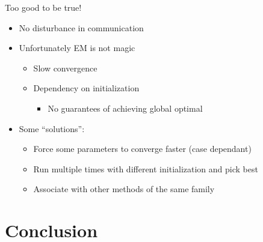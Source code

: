 \documentclass[aspectratio=169]{beamer}
\begin{document}

\begin{frame}{Too good to be true!}{}
  \begin{itemize}[<+(1)->]
    \item No disturbance in communication
    \item Unfortunately EM is not magic
          \begin{itemize}
            \item Slow convergence
            \item Dependency on initialization
                  \begin{itemize}
                    \item No guarantees of achieving global optimal
                  \end{itemize}
          \end{itemize}
    \item Some ``solutions'':
          \begin{itemize}
            \item Force some parameters to converge faster (case dependant)
            \item Run multiple times with different initialization and pick best
            \item Associate with other methods of the same family
          \end{itemize}
  \end{itemize}
\end{frame}


\section{Conclusion}
\end{document}
